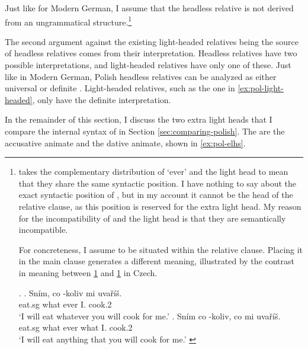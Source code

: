 Just like for Modern German, I assume that the headless relative is not derived from an ungrammatical structure.\footnote{
\citet{citko2004} takes the complementary distribution of  `ever' and the light head to mean that they share the same syntactic position. I have nothing to say about the exact syntactic position of , but in my account it cannot be the head of the relative clause, as this position is reserved for the extra light head. My reason for the incompatibility of  and the light head is that they are semantically incompatible.

For concreteness, I assume  to be situated within the relative clause. Placing it in the main clause generates a different meaning, illustrated by the contrast in meaning between \ref{ex:cz-wh-ever} and \ref{ex:cz-ever-wh} in Czech.

\ex.
\ag. Sním, co -koliv mi uvaříš.\\
 eat.sg what ever I. cook.2\\
 `I will eat whatever you will cook for me.'\label{ex:cz-wh-ever}
\bg. Sním co -koliv, co mi uvaříš.\\
 eat.sg what ever what I. cook.2\\
 `I will eat anything that you will cook for me.' \label{ex:cz-ever-wh}

\phantom{x}
}

The second argument against the existing light-headed relatives being the source of headless relatives comes from their interpretation. Headless relatives have two possible interpretations, and light-headed relatives have only one of these.
Just like in Modern German, Polish headless relatives can be analyzed as either universal or definite .
Light-headed relatives, such as the one in \ref{ex:pol-light-headed}, only have the definite interpretation.

In the remainder of this section, I discuss the two extra light heads that I compare the internal syntax of in Section \ref{sec:comparing-polish}. The are the accusative animate and the dative animate, shown in \ref{ex:pol-elhs}.

